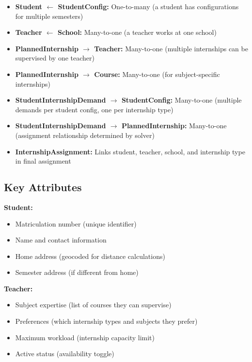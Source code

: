 \documentclass[12pt,a4paper]{report}
\begin{document}
\begin{itemize}
    \item \textbf{Student $\leftarrow$ StudentConfig:} One-to-many (a student has configurations for multiple semesters)
    \item \textbf{Teacher $\leftarrow$ School:} Many-to-one (a teacher works at one school)
    \item \textbf{PlannedInternship $\rightarrow$ Teacher:} Many-to-one (multiple internships can be supervised by one teacher)
    \item \textbf{PlannedInternship $\rightarrow$ Course:} Many-to-one (for subject-specific internships)
    \item \textbf{StudentInternshipDemand $\rightarrow$ StudentConfig:} Many-to-one (multiple demands per student config, one per internship type)
    \item \textbf{StudentInternshipDemand $\rightarrow$ PlannedInternship:} Many-to-one (assignment relationship determined by solver)
    \item \textbf{InternshipAssignment:} Links student, teacher, school, and internship type in final assignment
\end{itemize}

\subsection{Key Attributes}

\textbf{Student:}
\begin{itemize}
    \item Matriculation number (unique identifier)
    \item Name and contact information
    \item Home address (geocoded for distance calculations)
    \item Semester address (if different from home)
\end{itemize}

\textbf{Teacher:}
\begin{itemize}
    \item Subject expertise (list of courses they can supervise)
    \item Preferences (which internship types and subjects they prefer)
    \item Maximum workload (internship capacity limit)
    \item Active status (availability toggle)
\end{itemize}
\end{document}
